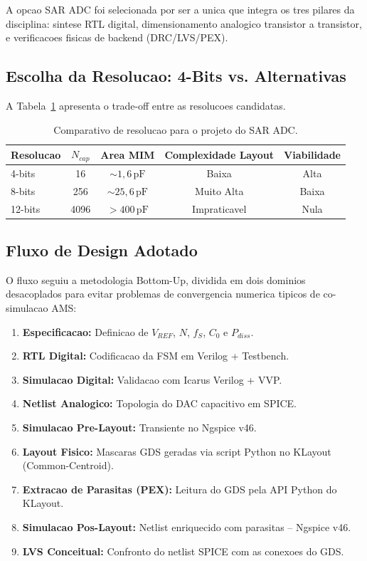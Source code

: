 \documentclass[12pt, a4paper]{article}
\begin{document}
A opcao SAR ADC foi selecionada por ser a unica que integra os tres pilares da disciplina:
sintese RTL digital, dimensionamento analogico transistor a transistor, e verificacoes fisicas
de backend (DRC/LVS/PEX).

\subsection{Escolha da Resolucao: 4-Bits vs. Alternativas}

A Tabela~\ref{tab:resolucao} apresenta o trade-off entre as resolucoes candidatas.

\begin{table}[h!]
\centering
\caption{Comparativo de resolucao para o projeto do SAR ADC.}
\label{tab:resolucao}
\begin{tabular}{lcccc}
\toprule
\textbf{Resolucao} & $N_{cap}$ & \textbf{Area MIM} & \textbf{Complexidade Layout} & \textbf{Viabilidade} \\
\midrule
4-bits  & 16  & $\sim 1{,}6\,\text{pF}$ & Baixa   & Alta \\
8-bits  & 256 & $\sim 25{,}6\,\text{pF}$ & Muito Alta & Baixa \\
12-bits & 4096 & $> 400\,\text{pF}$ & Impraticavel & Nula \\
\bottomrule
\end{tabular}
\end{table}

\subsection{Fluxo de Design Adotado}

O fluxo seguiu a metodologia Bottom-Up, dividida em dois dominios desacoplados para
evitar problemas de convergencia numerica tipicos de co-simulacao AMS:

\begin{enumerate}
  \item \textbf{Especificacao:} Definicao de $V_{REF}$, $N$, $f_S$, $C_0$ e $P_{diss}$.
  \item \textbf{RTL Digital:} Codificacao da FSM em Verilog + Testbench.
  \item \textbf{Simulacao Digital:} Validacao com Icarus Verilog + VVP.
  \item \textbf{Netlist Analogico:} Topologia do DAC capacitivo em SPICE.
  \item \textbf{Simulacao Pre-Layout:} Transiente no Ngspice v46.
  \item \textbf{Layout Fisico:} Mascaras GDS geradas via script Python no KLayout (Common-Centroid).
  \item \textbf{Extracao de Parasitas (PEX):} Leitura do GDS pela API Python do KLayout.
  \item \textbf{Simulacao Pos-Layout:} Netlist enriquecido com parasitas -- Ngspice v46.
  \item \textbf{LVS Conceitual:} Confronto do netlist SPICE com as conexoes do GDS.
\end{enumerate}
\end{document}
